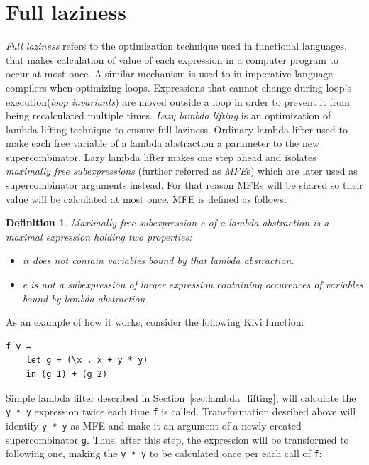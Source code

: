 \documentclass[12pt,a4paper]{report}
\newtheorem{definition}{Definition}[chapter]
\begin{document}
\section{Full laziness}
\textit{Full laziness} refers to the optimization technique used in functional
languages, that makes calculation of value of each expression in a computer
program to occur at most once. A similar mechanism is used to in imperative
language compilers when optimizing loops. Expressions that cannot change during
loop's execution(\textit{loop invariants}) are moved outside a loop in order to
prevent it from being recalculated multiple times.
\textit{Lazy lambda lifting} is an optimization of lambda lifting technique to
ensure full laziness. Ordinary lambda lifter used to make each free variable of
a lambda abstraction a parameter to the new supercombinator. Lazy lambda lifter
makes one step ahead and isolates \textit{maximally free subexpressions}
(further referred as \textit{MFE}s) which are later used as supercombinator
arguments instead. For that reason MFEs will be shared so their value will be
calculated at most once. MFE is defined as follows:

\begin{definition}
  Maximally free subexpression e of a lambda abstraction is a maximal
  expression holding two properties:

  \begin{itemize}
    \item it does not contain variables bound by that lambda abstraction.
    \item e is not a subexpression of larger expression containing occurences of
      variables bound by lambda abstraction
  \end{itemize}
\end{definition}

As an example of how it works, consider the following Kivi function:

\vspace*{0.2in}
\begin{lstlisting}[style=haskell]
f y =
    let g = (\x . x + y * y)
    in (g 1) + (g 2)
\end{lstlisting}

Simple lambda lifter described in Section~\ref{sec:lambda_lifting}, will
calculate the \texttt{y * y} expression twice each time \texttt{f} is called.
Transformation desribed above will identify \texttt{y * y} as MFE and make it
an argument of a newly created supercombinator \texttt{g}. Thus, after this
step, the expression will be transformed to following one, making the \texttt{y
* y} to be calculated once per each call of \texttt{f}:
\end{document}
